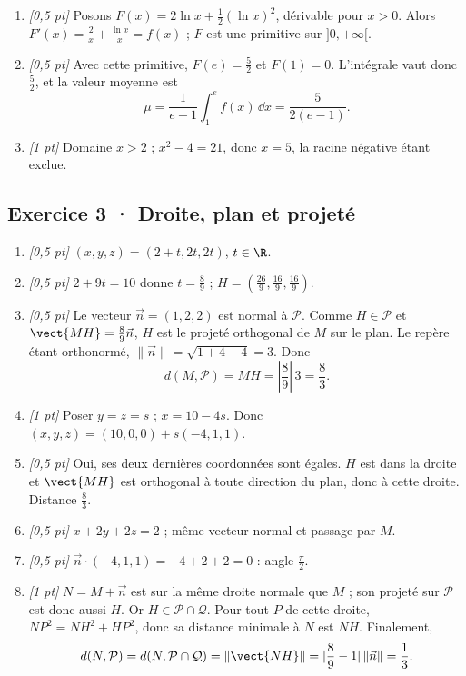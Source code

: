 \begin{enumerate}
\item \textit{[0{,}5 pt]} Posons $F(x)=2\ln x+\frac12(\ln x)^2$, dérivable pour $x>0$. Alors $F'(x)=\frac{2}{x}+\frac{\ln x}{x}=f(x)$ ; $F$ est une primitive sur $]0,+\infty[$.

\item \textit{[0{,}5 pt]} Avec cette primitive, $F(e)=\frac{5}{2}$ et $F(1)=0$. L'intégrale vaut donc $\frac{5}{2}$, et la valeur moyenne est
\[\mu=\frac{1}{e-1}\int_1^e f(x)\,\dd x=\frac{5}{2(e-1)}.\]

\item \textit{[1 pt]} Domaine $x>2$ ; $x^2-4=21$, donc $x=5$, la racine négative étant exclue.

\end{enumerate}

\subsection*{Exercice 3 · Droite, plan et projeté}\begin{enumerate}

\item \textit{[0{,}5 pt]} $(x,y,z)=(2+t,2t,2t)$, $t\in\R$.

\item \textit{[0{,}5 pt]} $2+9t=10$ donne $t=\frac{8}{9}$ ; $H=(\frac{26}{9},\frac{16}{9},\frac{16}{9})$.

\item \textit{[0{,}5 pt]} Le vecteur $\vec n=(1,2,2)$ est normal à $\mathcal P$. Comme $H\in\mathcal P$ et $\vect{MH}=\frac{8}{9}\vec n$, $H$ est le projeté orthogonal de $M$ sur le plan. Le repère étant orthonormé, $\|\vec n\|=\sqrt{1+4+4}=3$. Donc
\[d(M,\mathcal P)=MH=|\frac{8}{9}|\,3=\frac{8}{3}.\]

\item \textit{[1 pt]} Poser $y=z=s$ ; $x=10-4s$. Donc $(x,y,z)=(10,0,0)+s(-4,1,1)$.

\item \textit{[0{,}5 pt]} Oui, ses deux dernières coordonnées sont égales. $H$ est dans la droite et $\vect{MH}$ est orthogonal à toute direction du plan, donc à cette droite. Distance $\frac{8}{3}$.

\item \textit{[0{,}5 pt]} $x+2y+2z=2$ ; même vecteur normal et passage par $M$.

\item \textit{[0{,}5 pt]} $\vec n\cdot(-4,1,1)=-4+2+2=0$ : angle $\frac{\pi}{2}$.

\item \textit{[1 pt]} $N=M+\vec n$ est sur la même droite normale que $M$ ; son projeté sur $\mathcal P$ est donc aussi $H$. Or $H\in\mathcal P\cap\mathcal Q$. Pour tout $P$ de cette droite, $NP^2=NH^2+HP^2$, donc sa distance minimale à $N$ est $NH$. Finalement,
\[d(N,\mathcal P)=d(N,\mathcal P\cap\mathcal Q)=\|\vect{NH}\|=|\frac{8}{9}-1|\,\|\vec n\|=\frac{1}{3}.\]

\end{enumerate}

